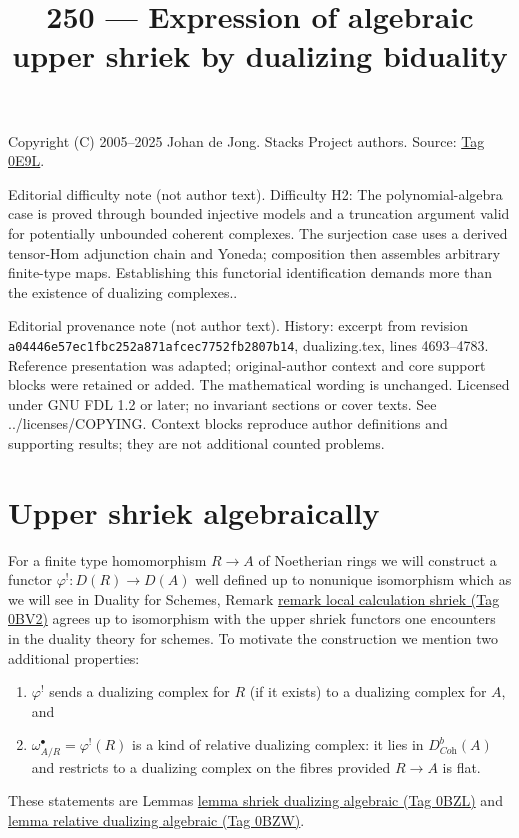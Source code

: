 \documentclass{amsart}
\theoremstyle{plain}
\theoremstyle{definition}
\theoremstyle{remark}
\numberwithin{equation}{subsection}
\begin{document}
\title[Stacks Project, Tag 0E9L]{250 --- Expression of algebraic upper shriek by dualizing biduality}
\maketitle
\noindent Copyright (C) 2005--2025 Johan de Jong. Stacks Project authors. Source: \href{https://stacks.math.columbia.edu/tag/0E9L}{Tag 0E9L}.

\noindent Editorial difficulty note (not author text). Difficulty H2: The polynomial-algebra case is proved through bounded injective models and a truncation argument valid for potentially unbounded coherent complexes. The surjection case uses a derived tensor-Hom adjunction chain and Yoneda; composition then assembles arbitrary finite-type maps. Establishing this functorial identification demands more than the existence of dualizing complexes..

\noindent Editorial provenance note (not author text). History: excerpt from revision \texttt{a0444\allowbreak 6e57e\allowbreak c1fbc\allowbreak 252a8\allowbreak 71afc\allowbreak ec775\allowbreak 2fb28\allowbreak 07b14}, dualizing.tex, lines 4693--4783. Reference presentation was adapted; original-author context and core support blocks were retained or added. The mathematical wording is unchanged. Licensed under GNU FDL 1.2 or later; no invariant sections or cover texts. See ../licenses/COPYING. Context blocks reproduce author definitions and supporting results; they are not additional counted problems.

\section{Upper shriek algebraically}
\label{section-relative-dualizing-complex-algebraic}

\noindent
For a finite type homomorphism $R \to A$ of Noetherian rings
we will construct a functor $\varphi^! : D(R) \to D(A)$
well defined up to nonunique isomorphism which
as we will see in Duality for Schemes, Remark
\href{https://stacks.math.columbia.edu/tag/0BV2}{remark local calculation shriek (Tag 0BV2)}
agrees up to isomorphism with the upper shriek functors
one encounters in the duality theory for schemes.
To motivate the construction we mention two additional properties:
\begin{enumerate}
\item $\varphi^!$ sends a dualizing complex for $R$ (if it exists)
to a dualizing complex for $A$, and
\item $\omega_{A/R}^\bullet = \varphi^!(R)$ is a kind of
relative dualizing complex: it lies in $D^b_{\textit{Coh}}(A)$ and restricts
to a dualizing complex on the fibres provided $R \to A$ is flat.
\end{enumerate}
These statements are Lemmas \href{https://stacks.math.columbia.edu/tag/0BZL}{lemma shriek dualizing algebraic (Tag 0BZL)} and
\href{https://stacks.math.columbia.edu/tag/0BZW}{lemma relative dualizing algebraic (Tag 0BZW)}.
\end{document}
